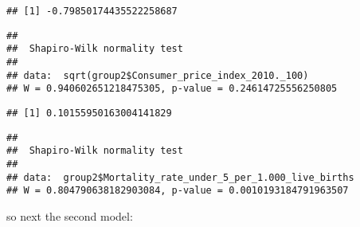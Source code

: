 \documentclass[
]{article}
\newenvironment{Shaded}{\begin{snugshade}}{\end{snugshade}}
\newcommand{\FloatTok}[1]{\textcolor[rgb]{0.00,0.00,0.81}{#1}}
\newcommand{\FunctionTok}[1]{\textcolor[rgb]{0.13,0.29,0.53}{\textbf{#1}}}
\newcommand{\NormalTok}[1]{#1}
\newcommand{\OtherTok}[1]{\textcolor[rgb]{0.56,0.35,0.01}{#1}}
\newcommand{\SpecialCharTok}[1]{\textcolor[rgb]{0.81,0.36,0.00}{\textbf{#1}}}
\begin{document}
\begin{verbatim}
## [1] -0.79850174435522258687
\end{verbatim}

\begin{Shaded}
\end{Shaded}

\begin{verbatim}
## 
##  Shapiro-Wilk normality test
## 
## data:  sqrt(group2$Consumer_price_index_2010._100)
## W = 0.940602651218475305, p-value = 0.24614725556250805
\end{verbatim}

\begin{Shaded}
\end{Shaded}

\begin{verbatim}
## [1] 0.10155950163004141829
\end{verbatim}

\begin{Shaded}
\end{Shaded}

\begin{verbatim}
## 
##  Shapiro-Wilk normality test
## 
## data:  group2$Mortality_rate_under_5_per_1.000_live_births
## W = 0.804790638182903084, p-value = 0.0010193184791963507
\end{verbatim}

so next the second model:

\begin{Shaded}
\end{Shaded}
\end{document}
